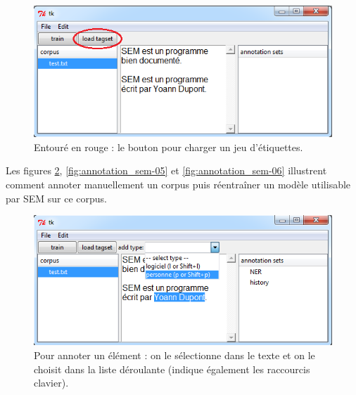 \documentclass[manual-fr.tex]{subfiles}
\begin{document}
\begin{figure}[ht!]
    \begin{center}
    \includegraphics[scale=0.5]{fr/images/annotation_sem-03.png}
    \end{center}
    \caption{Entouré en rouge : le bouton pour charger un jeu d'étiquettes.}
    \label{fig:annotation_sem-03}
\end{figure}


Les figures \ref{fig:annotation_sem-04}, \ref{fig:annotation_sem-05} et \ref{fig:annotation_sem-06} illustrent comment annoter manuellement un corpus puis réentraîner un modèle utilisable par SEM sur ce corpus.


\begin{figure}[ht!]
    \begin{center}
    \includegraphics[scale=0.5]{fr/images/annotation_sem-04.png}
    \end{center}
    \caption{Pour annoter un élément : on le sélectionne dans le texte et on le choisit dans la liste déroulante (indique également les raccourcis clavier).}
    \label{fig:annotation_sem-04}
\end{figure}
\end{document}
